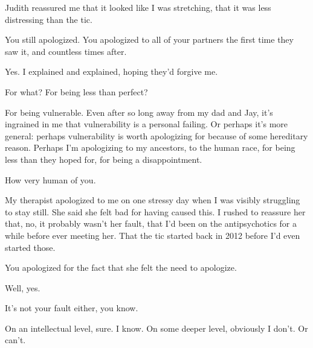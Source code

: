 Judith reassured me that it looked like I was stretching, that it was less distressing than the tic.

\begin{ally}
You still apologized. You apologized to all of your partners the first time they saw it, and countless times after.
\end{ally}
Yes. I explained and explained, hoping they'd forgive me.

\begin{ally}
For what? For being less than perfect?
\end{ally}
For being vulnerable. Even after so long away from my dad and Jay, it's ingrained in me that vulnerability is a personal failing. Or perhaps it's more general: perhaps vulnerability is worth apologizing for because of some hereditary reason. Perhaps I'm apologizing to my ancestors, to the human race, for being less than they hoped for, for being a disappointment.

\begin{ally}
How very human of you.
\end{ally}
My therapist apologized to me on one stressy day when I was visibly struggling to stay still. She said she felt bad for having caused this. I rushed to reassure her that, no, it probably wasn't her fault, that I'd been on the antipsychotics for a while before ever meeting her. That the tic started back in 2012 before I'd even started those.

\begin{ally}
You apologized for the fact that she felt the need to apologize.
\end{ally}
Well, yes.

\begin{ally}
It's not your fault either, you know.
\end{ally}
On an intellectual level, sure. I know. On some deeper level, obviously I don't. Or can't.
\newpage
